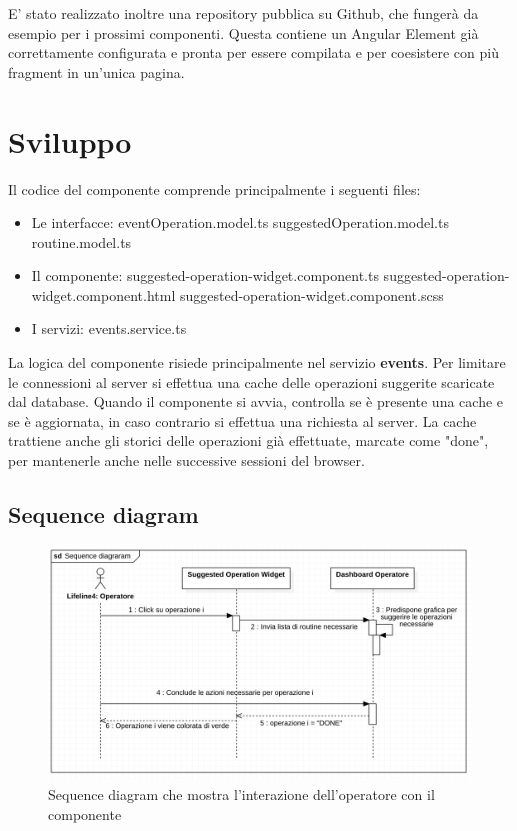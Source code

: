 E' stato realizzato inoltre una repository pubblica su Github, che fungerà da esempio per i prossimi componenti. 
Questa contiene un Angular Element già correttamente configurata e pronta per essere compilata e 
per coesistere con più fragment in un'unica pagina.\cite{repogit}

\section{Sviluppo}
Il codice del componente comprende principalmente i seguenti files:
\begin{itemize}
    \item Le interfacce:
    \subitem eventOperation.model.ts
    \subitem suggestedOperation.model.ts
    \subitem routine.model.ts
\end{itemize}

\begin{itemize}
    \item Il componente:
    \subitem suggested-operation-widget.component.ts
    \subitem suggested-operation-widget.component.html
    \subitem suggested-operation-widget.component.scss
\end{itemize}

\begin{itemize}
    \item I servizi:
    \subitem events.service.ts
 \end{itemize}

 La logica del componente risiede principalmente nel servizio \textbf{events}.
 Per limitare le connessioni al server si effettua una cache delle operazioni suggerite scaricate dal database.
 Quando il componente si avvia, controlla se è presente una cache e se è aggiornata, in caso contrario si effettua una richiesta
 al server.
 La cache trattiene anche gli storici delle operazioni già effettuate, marcate come "done", 
 per mantenerle anche nelle successive sessioni del browser.



\subsection{Sequence diagram}

\begin{figure}[H]
    \centering
    \includegraphics[width=150mm]{img/sequence}
    \caption{Sequence diagram che mostra l'interazione dell'operatore con il componente}
  \end{figure}


